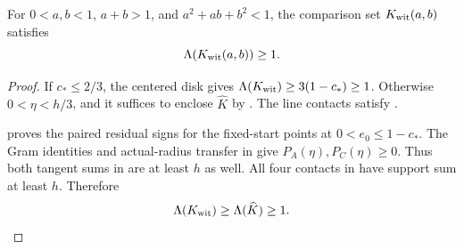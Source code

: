 
\begin{theorem}
\label{thm:reader-witness-enclosure}
\label{lem:appendix-witness-enclosure-calculation}

For $0<a,b<1$, $a+b>1$, and $a^2+ab+b^2<1$, the comparison set
$K_{\rm wit}(a,b)$ satisfies
\[
 \Lambda(K_{\rm wit}(a,b))\ge1.
\]
\end{theorem}
\begin{proof}
If $c_*\le2/3$, the centered disk gives
$\Lambda(K_{\rm wit})\ge3(1-c_*)\ge1$. Otherwise
$0<\eta<h/3$, and it suffices to enclose $\widehat K$ by
. The line contacts satisfy
.

 proves the paired residual
signs for the fixed-start points at $0<e_0\le1-c_*$.  The Gram identities
and actual-radius transfer in 
give $P_A(\eta),P_C(\eta)\ge0$. Thus both tangent sums in
 are at least $h$ as well.
All four contacts in  have support sum at
least $h$. Therefore
\[
 \Lambda(K_{\rm wit})\ge\Lambda(\widehat K)\ge1.
\]
\end{proof}

